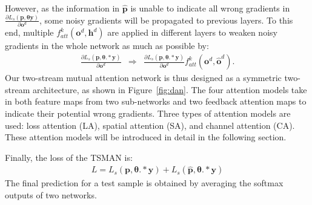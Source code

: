 \documentclass[letterpaper]{article} %
\begin{document}
However, as the information in $\widehat{\boldsymbol{p}}$ is unable to indicate all wrong gradients in $\frac{\partial L_s(\boldsymbol{p},\bm{\theta} \boldsymbol{y})}{\partial \boldsymbol{o}^d}$, some noisy gradients will be propagated to previous layers.
To this end, multiple $f_{att}^k(\boldsymbol{o}^d,\boldsymbol{h}^d)$ are applied in different layers to weaken noisy gradients in the whole network as much as possible by:
\begin{eqnarray}\label{eq:at2}
\frac{\partial L_s(\boldsymbol{p},\bm{\theta}.*\boldsymbol{y})}{\partial\boldsymbol{o}^d} &\Rightarrow& \frac{\partial L_s(\boldsymbol{p},\bm{\theta}.*\boldsymbol{y})}{\partial \boldsymbol{o}^d}f_{att}^k(\boldsymbol{o}^d,\widehat{\boldsymbol{o}}^d).
\end{eqnarray}
Our two-stream mutual attention network is thus designed as a symmetric two-stream architecture, as shown in Figure~\ref{fig:dan}. The four attention models take in both feature maps from two sub-networks and two feedback attention maps to indicate their potential wrong gradients.
Three types of attention models are used: loss attention (LA), spatial attention (SA), and channel attention (CA). These attention models will be introduced in detail in the following section.

Finally, the loss of the TSMAN is:
\begin{eqnarray}\label{eq:fl}
L = L_s(\boldsymbol{p},\bm{\theta}.*\boldsymbol{y})+L_s(\widehat{\boldsymbol{p}},\bm{\theta}.*\boldsymbol{y})
\end{eqnarray}
The final prediction for a test sample is obtained by averaging the softmax outputs of two networks.
\end{document}
